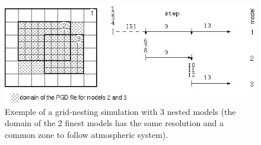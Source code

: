 \begin{itemize}
\begin{enumerate}
\end{enumerate} 

\begin{figure}[htb]
\vspace*{1.cm}
\includegraphics[width=15.cm]{annexes/seq2}
\caption{Exemple of a grid-nesting simulation with 3 nested models (the domain
of the 2 finest models has the same resolution and a common zone to follow
atmospheric system).
\label{seq2}}
\end{figure}
\end{itemize} 
